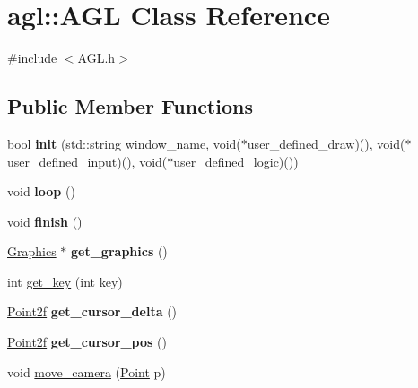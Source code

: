 \hypertarget{classagl_1_1AGL}{}\section{agl\+::A\+GL Class Reference}
\label{classagl_1_1AGL}


{\ttfamily \#include $<$A\+G\+L.\+h$>$}

\subsection*{Public Member Functions}
\begin{DoxyCompactItemize}
\item 
\mbox{\label{classagl_1_1AGL_a010211a344c7e94a3416761e63a06fb3}} 
bool {\bfseries init} (std\+::string window\+\_\+name, void($\ast$user\+\_\+defined\+\_\+draw)(), void($\ast$user\+\_\+defined\+\_\+input)(), void($\ast$user\+\_\+defined\+\_\+logic)())
\item 
\mbox{\label{classagl_1_1AGL_a926d2e9ca26362ceda4e83857ee9f27e}} 
void {\bfseries loop} ()
\item 
\mbox{\label{classagl_1_1AGL_af213f2a9e4e4ad31481c1c0d9a6b3a4b}} 
void {\bfseries finish} ()
\item 
\mbox{\label{classagl_1_1AGL_abe94fc5217f011c3a4f00d26a1109f4a}} 
\mbox{\hyperlink{classagl_1_1Graphics}{Graphics}} $\ast$ {\bfseries get\+\_\+graphics} ()
\item 
int \mbox{\hyperlink{classagl_1_1AGL_a707632eae21db760f91ea745f951a8df}{get\+\_\+key}} (int key)
\item 
\mbox{\label{classagl_1_1AGL_a27e2b7cf0e9f90c2a3313f8d3866ca14}} 
\mbox{\hyperlink{classagl_1_1Point2f}{Point2f}} {\bfseries get\+\_\+cursor\+\_\+delta} ()
\item 
\mbox{\label{classagl_1_1AGL_a92d0ca5753ad4c00d6e321db18667d66}} 
\mbox{\hyperlink{classagl_1_1Point2f}{Point2f}} {\bfseries get\+\_\+cursor\+\_\+pos} ()
\item 
void \mbox{\hyperlink{classagl_1_1AGL_ac81c6ecc1363396270485955320b376b}{move\+\_\+camera}} (\mbox{\hyperlink{classagl_1_1Point}{Point}} p)
\item 

\end{DoxyCompactItemize}
